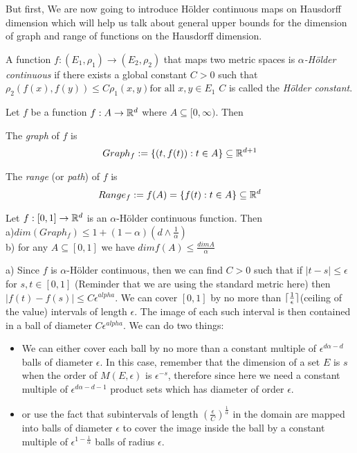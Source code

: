 \documentclass{article}
\begin{document}
But first, We are now going to introduce H{\"o}lder continuous maps on Hausdorff dimension which will help us talk about general upper bounds for the dimension of graph and range of functions on the Hausdorff dimension.

\begin{definition}
A function $f:(E_1,\rho_1)\rightarrow (E_2,\rho_2)$ that maps two metric spaces is \textit{$\alpha$-H{\"o}lder continuous} if there exists a global constant $C>0$ such that 
$\rho_2(f(x),f(y))\leq C\rho_1(x,y) \text{for all }x,y\in E_1$
$C$ is called the \textit{H{\"o}lder constant}.

\end{definition}

Let $f$ be a function $f:A\rightarrow \mathbb{R}^d$ where $A\subseteq [0,\infty)$. Then 
\begin{definition}[Graph]
The \textit{graph} of $f$ is $$Graph_f:=\{(t,f(t)):t\in A\}\subseteq \mathbb{R}^{d+1}$$
\end{definition}

\begin{definition}[Range]
The \textit{range} (or \textit{path}) of $f$ is $$Range_f:=f(A)=\{f(t):t\in A\}\subseteq \mathbb{R}^d$$
\end{definition}

\begin{lemma}
Let $f:[0,1]\rightarrow \mathbb{R}^d$ is an $\alpha$-H{\"o}lder continuous function. Then \\
a)$dim(Graph_f)\leq 1+(1-\alpha)(d \land \frac{1}{\alpha})$\\
b) for any $A\subseteq [0,1]$ we have $dim f(A)\leq\frac{dim A}{\alpha}$
\end{lemma}
\proof
a) Since $f$ is $\alpha$-H{\"o}lder continuous, then we can find $C>0$ such that if $|t-s|\leq \epsilon$ for $s,t\in [0,1]$ (Reminder that we are using the standard metric here) then $|f(t)-f(s)|\leq C\epsilon^{alpha}$. We can cover $[0,1]$ by no more than $\lceil\frac{1}{\epsilon}\rceil$(ceiling of the value) intervals of length $\epsilon$. The image of each such interval is then contained in a ball of diameter $C\epsilon^{alpha}$. We can do two things:
\begin{itemize}
    \item We can either cover each ball by no more than a constant multiple of $\epsilon^{d\alpha-d}$ balls of diameter $\epsilon$. In this case, remember that the dimension of a set $E$ is $s$ when the order of $M(E,\epsilon)$ is $\epsilon^{-s}$, therefore since here we need a constant multiple of $\epsilon^{d\alpha-d-1}$ product sets which has diameter of order $\epsilon$.
    \item or use the fact that subintervals of length $(\frac{\epsilon}{C})^{\frac{1}{\alpha}}$ in the domain are mapped into balls of diameter $\epsilon$ to cover the image inside the ball by a constant multiple of $\epsilon^{1-\frac{1}{\alpha}}$ balls of radius $\epsilon$.
\end{itemize}
\end{document}
